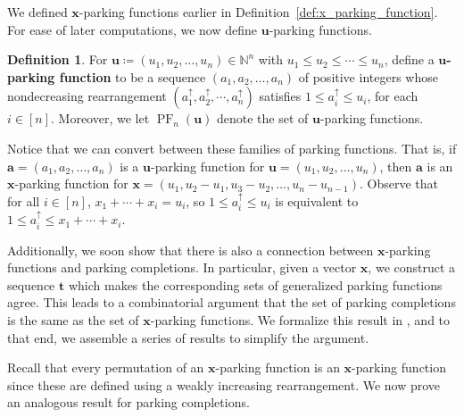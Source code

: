 \documentclass{amsart}
\theoremstyle{definition}
\newtheorem{definition}[theorem]{Definition}
\numberwithin{equation}{section}
\newcommand{\PF}{\operatorname{PF}} %
\begin{document}
We defined $\mathbf{x}$-parking functions earlier in Definition~\ref{def:x_parking_function}.
For ease of later computations, we now define $\mathbf{u}$-parking functions.

\begin{definition}\label{def:u_pkg_fn}
    For $\mathbf{u} \coloneqq (u_1, u_2, \hdots, u_n) \in \mathbb{N}^n$ with $u_1 \leq u_2 \leq \cdots \leq u_n$, define a \textbf{$\mathbf{u}$-parking function} to be a sequence $(a_1, a_2, \hdots, a_n)$ of positive integers whose nondecreasing rearrangement $(a_1^{\uparrow}, a_2^{\uparrow}, \cdots, a_n^{\uparrow})$ satisfies $1 \leq a_i^{\uparrow} \leq u_i$, for each $i\in[n]$.
    Moreover, we let $\PF_n(\mathbf{u})$ denote the set of $\mathbf{u}$-parking functions.
\end{definition} 

Notice that we can convert between these families of parking functions. 
That is, if $\mathbf{a}=(a_1,a_2,\ldots,a_n)$ is a $\mathbf{u}$-parking function for $\mathbf{u} = (u_1, u_2, \hdots, u_n)$, then $\mathbf{a}$ is an $\mathbf{x}$-parking function for $\mathbf{x} = (u_1, u_2-u_1, u_3-u_2, \hdots, u_{n} - u_{n-1})$.
Observe that for all $i \in [n]$, $x_1 + \cdots + x_i = u_i$, so $1 \leq a_i^{\uparrow} \leq u_i$ is equivalent to $1 \leq a_i^{\uparrow} \leq x_1 + \cdots + x_i$.

Additionally, we soon show that there is also a connection between $\mathbf{x}$-parking functions and parking completions. 
In particular, given a vector $\mathbf{x}$, we construct a sequence $\mathbf{t}$ which makes the corresponding sets of generalized parking functions agree. 
This leads to a combinatorial argument that the set of parking completions is the same as the set of $\mathbf{x}$-parking functions.
We formalize this result in , and to that end, we assemble a series of results to simplify the argument.


Recall that every permutation of an $\mathbf{x}$-parking function is an $\mathbf{x}$-parking function since these are defined using a weakly increasing rearrangement. 
We now prove an analogous result for parking completions.
\end{document}
